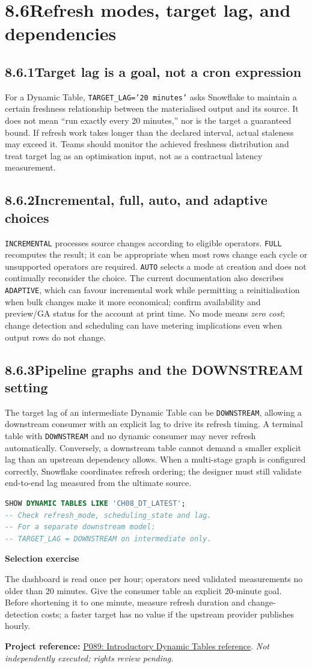 \documentclass[11pt,twoside]{article}
\newcommand{\topic}[2]{\subsection*{#1\quad #2}}
\newcommand{\repo}[2]{\par\begingroup\fontsize{8.0}{9.6}\selectfont\sffamily\color{inkgray}\textbf{Project reference:} \href{#2}{#1}. \textit{Not independently executed; rights review pending.}\par\endgroup}
\begin{document}
\section*{8.6\quad Refresh modes, target lag, and dependencies}
\topic{8.6.1}{Target lag is a goal, not a cron expression}
For a Dynamic Table, \texttt{TARGET\_LAG='20 minutes'} asks Snowflake to maintain a certain freshness relationship between the materialised output and its source. It does not mean ``run exactly every 20 minutes,'' nor is the target a guaranteed bound. If refresh work takes longer than the declared interval, actual staleness may exceed it. Teams should monitor the achieved freshness distribution and treat target lag as an optimisation input, not as a contractual latency measurement.
\topic{8.6.2}{Incremental, full, auto, and adaptive choices}
\texttt{INCREMENTAL} processes source changes according to eligible operators. \texttt{FULL} recomputes the result; it can be appropriate when most rows change each cycle or unsupported operators are required. \texttt{AUTO} selects a mode at creation and does not continually reconsider the choice. The current documentation also describes \texttt{ADAPTIVE}, which can favour incremental work while permitting a reinitialisation when bulk changes make it more economical; confirm availability and preview/GA status for the account at print time. No mode means \emph{zero cost}; change detection and scheduling can have metering implications even when output rows do not change.
\topic{8.6.3}{Pipeline graphs and the DOWNSTREAM setting}
The target lag of an intermediate Dynamic Table can be \texttt{DOWNSTREAM}, allowing a downstream consumer with an explicit lag to drive its refresh timing. A terminal table with \texttt{DOWNSTREAM} and no dynamic consumer may never refresh automatically. Conversely, a downstream table cannot demand a smaller explicit lag than an upstream dependency allows. When a multi-stage graph is configured correctly, Snowflake coordinates refresh ordering; the designer must still validate end-to-end lag measured from the ultimate source.
\begin{lstlisting}[language=SQL,caption={Inspection after creation; outputs require interpretation.}]
SHOW DYNAMIC TABLES LIKE 'CH08_DT_LATEST';
-- Check refresh_mode, scheduling_state and lag.
-- For a separate downstream model:
-- TARGET_LAG = DOWNSTREAM on intermediate only.
\end{lstlisting}
\begin{whitebox}\textbf{Selection exercise}\par
The dashboard is read once per hour; operators need validated measurements no older than 20 minutes. Give the consumer table an explicit 20-minute goal. Before shortening it to one minute, measure refresh duration and change-detection costs; a faster target has no value if the upstream provider publishes hourly.\end{whitebox}
\repo{P089: Introductory Dynamic Tables reference}{https://github.com/Snowflake-Labs/getting-started-with-dynamic-tables}
\newpage
\end{document}
